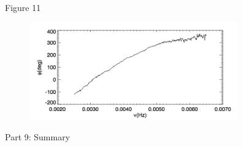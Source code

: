 \documentclass{beamer}
\begin{document}
\begin{frame}{Figure 11}
    \begin{figure}
        \includegraphics[width=0.8\textwidth]{fig_11.png}
    \end{figure}
\end{frame}

\begin{frame}{Part 9: Summary}
\end{frame}

\end{document}
